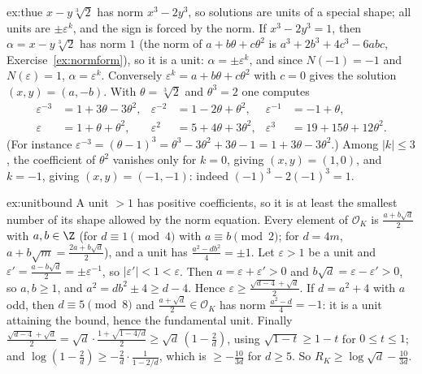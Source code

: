 \begin{solution}{ex:thue}
\idea $x-y\sqrt[3]2$ has norm $x^3-2y^3$, so solutions are units of a special shape; all units are $\pm\varepsilon^k$, and
the sign is forced by the norm.
\writeup If $x^3-2y^3=1$, then $\alpha=x-y\sqrt[3]2$ has norm $1$ (the norm of $a+b\theta+c\theta^2$ is $a^3+2b^3+4c^3-6abc$,
Exercise~\ref{ex:normform}), so it is a unit: $\alpha=\pm\varepsilon^k$, and since $N(-1)=-1$ and $N(\varepsilon)=1$, $\alpha=
\varepsilon^k$. Conversely $\varepsilon^k=a+b\theta+c\theta^2$ with $c=0$ gives the solution $(x,y)=(a,-b)$. With
$\theta=\sqrt[3]2$ and $\theta^3=2$ one computes
\[
\begin{aligned}
\varepsilon^{-3}&=1+3\theta-3\theta^2,&\varepsilon^{-2}&=1-2\theta+\theta^2,&\varepsilon^{-1}&=-1+\theta,\\
\varepsilon&=1+\theta+\theta^2,&\varepsilon^2&=5+4\theta+3\theta^2,&\varepsilon^3&=19+15\theta+12\theta^2.
\end{aligned}
\]
(For instance $\varepsilon^{-3}=(\theta-1)^3=\theta^3-3\theta^2+3\theta-1=1+3\theta-3\theta^2$.) Among $|k|\le3$, the
coefficient of $\theta^2$ vanishes only for $k=0$, giving $(x,y)=(1,0)$, and $k=-1$, giving $(x,y)=(-1,-1)$: indeed
$(-1)^3-2(-1)^3=1$.
\end{solution}

\begin{solution}{ex:unitbound}
\idea A unit $>1$ has positive coefficients, so it is at least the smallest number of its shape allowed by the norm
equation.
\writeup Every element of $\mathcal O_K$ is $\frac{a+b\sqrt d}2$ with $a,b\in\Z$ (for $d\equiv1\pmod4$ with $a\equiv b\pmod2$;
for $d=4m$, $a+b\sqrt m=\frac{2a+b\sqrt d}2$), and a unit has $\frac{a^2-db^2}4=\pm1$. Let $\varepsilon>1$ be a unit and
$\varepsilon'=\frac{a-b\sqrt d}2=\pm\varepsilon^{-1}$, so $|\varepsilon'|<1<\varepsilon$. Then $a=\varepsilon+\varepsilon'>0$ and
$b\sqrt d=\varepsilon-\varepsilon'>0$, so $a,b\ge1$, and $a^2=db^2\pm4\ge d-4$. Hence $\varepsilon\ge\frac{\sqrt{d-4}+
\sqrt d}2$. If $d=a^2+4$ with $a$ odd, then $d\equiv5\pmod 8$ and $\frac{a+\sqrt d}2\in\mathcal O_K$ has norm $\frac{a^2-d}4=-1$:
it is a unit attaining the bound, hence the fundamental unit. Finally $\frac{\sqrt{d-4}+\sqrt d}2=\sqrt d\cdot\frac{1+\sqrt{1-4/d}}
2\ge\sqrt d\,(1-\frac2d)$, using $\sqrt{1-t}\ge1-t$ for $0\le t\le1$; and $\log(1-\frac2d)\ge-\frac2d\cdot\frac1{1-2/d}$, which is
$\ge-\frac{10}{3d}$ for $d\ge5$. So $R_K\ge\log\sqrt d-\frac{10}{3d}$.
\end{solution}

